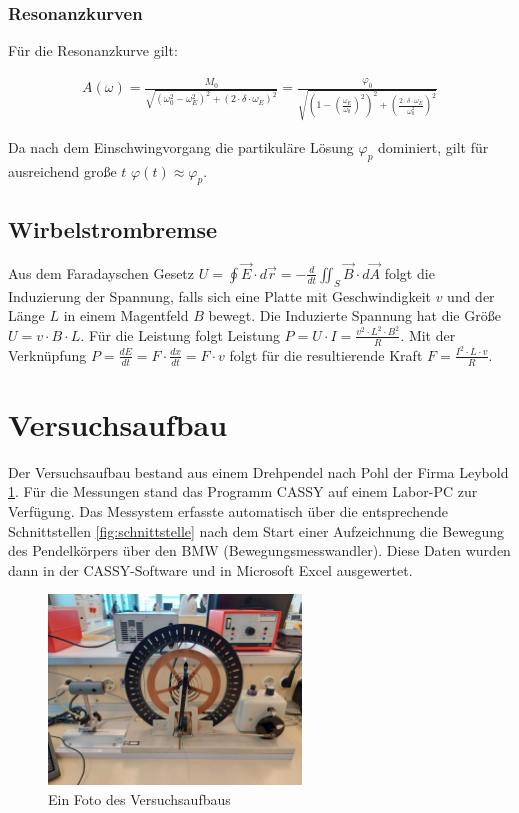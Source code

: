 \documentclass{article}
\begin{document}
\subsubsection{Resonanzkurven}
Für die Resonanzkurve gilt:

\begin{gather} \label{eq:resonanzkurve}
    A(\omega) = \frac{M_0}{\sqrt{(\omega_0^2 - \omega_E^2)^2 + (2 \cdot \delta \cdot \omega_E)^2}}
    = \frac{\varphi_0}{\sqrt{(1 - (\frac{\omega_E}{\omega_0})^2)^2 + (\frac{2 \cdot \delta \cdot \omega_E}{\omega_0^2})^2}}
\end{gather}

Da nach dem Einschwingvorgang die partikuläre Lösung $\varphi_p$ dominiert, gilt für ausreichend große $t$ $\varphi(t) \approx \varphi_p$.

\subsection{Wirbelstrombremse}
Aus dem Faradayschen Gesetz $U = \oint \vec{E} \cdot d \vec{r} = -\frac{d}{dt} \iint_S \vec{B} \cdot d \vec{A}$ folgt die Induzierung der Spannung,
falls sich eine Platte mit Geschwindigkeit $v$ und der Länge $L$ in einem Magentfeld $B$ bewegt. Die Induzierte Spannung hat die Größe $U = v \cdot B \cdot L$.
Für die Leistung folgt Leistung $P = U \cdot I = \frac{v^2 \cdot L^2 \cdot B^2}{R}$. Mit der Verknüpfung $P = \frac{dE}{dt} = F \cdot \frac{dx}{dt} = F \cdot v$ folgt
für die resultierende Kraft $F = \frac{I^2 \cdot L \cdot v}{R}$.

\section{Versuchsaufbau}
Der Versuchsaufbau bestand aus einem Drehpendel nach Pohl der Firma Leybold \ref{fig:versuchsaufbau}.
Für die Messungen stand das Programm CASSY auf einem Labor-PC zur Verfügung.
Das Messystem erfasste automatisch über die entsprechende Schnittstellen \ref{fig:schnittstelle}
nach dem Start einer Aufzeichnung die Bewegung des Pendelkörpers
über den BMW (Bewegungsmesswandler). Diese Daten wurden dann in der CASSY-Software
und in Microsoft Excel ausgewertet.

\begin{figure}[H]
    \centering
    \includegraphics[width=0.6\textwidth]{bilder/drehpendel.jpg}
    \caption{Ein Foto des Versuchsaufbaus}
    \label{fig:versuchsaufbau}
\end{figure}
\end{document}
